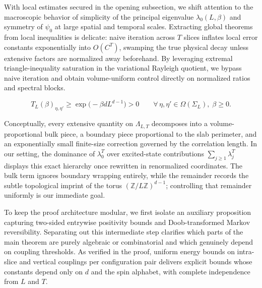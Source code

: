\documentclass[11pt]{article}
\theoremstyle{definition}
\begin{document}
With local estimates secured in the opening subsection, we shift attention to the
macroscopic behavior of simplicity of the principal eigenvalue $\lambda_0(L, \beta)$
and symmetry of $\psi_0$ at large spatial and temporal scales. Extracting global
theorems from local inequalities is delicate: naive iteration across $T$ slices
inflates local error constants exponentially into $O(C^T)$, swamping the true
physical decay unless extensive factors are normalized away beforehand. By
leveraging extremal triangle-inequality saturation in the variational Rayleigh
quotient, we bypass naive iteration and obtain volume-uniform control directly on
normalized ratios and spectral blocks.

\[
  T_L(\beta)_{\eta, \eta'} \ge \exp\!\bigl(-\beta d L^{d-1}\bigr) > 0 \qquad \forall \, \eta, \eta' \in \Omega(\Sigma_L),\; \beta \ge 0.
\]

Conceptually, every extensive quantity on $\Lambda_{L,T}$ decomposes into a
volume-proportional bulk piece, a boundary piece proportional to the slab perimeter,
and an exponentially small finite-size correction governed by the correlation
length. In our setting, the dominance of $\lambda_0^T$ over excited-state
contributions $\sum_{j \ge 1} \lambda_j^T$ displays this exact hierarchy once
rewritten in renormalized coordinates. The bulk term ignores boundary wrapping
entirely, while the remainder records the subtle topological imprint of the torus
$(\mathbb{Z}/L\mathbb{Z})^{d-1}$; controlling that remainder uniformly is our
immediate goal.

To keep the proof architecture modular, we first isolate an auxiliary proposition
capturing two-sided entrywise positivity bounds and Doob-transformed Markov
reversibility. Separating out this intermediate step clarifies which parts of the
main theorem are purely algebraic or combinatorial and which genuinely depend on
coupling thresholds. As verified in the proof, uniform energy bounds on intra-slice
and vertical couplings per configuration pair delivers explicit bounds whose
constants depend only on $d$ and the spin alphabet, with complete independence from
$L$ and $T$.
\end{document}
